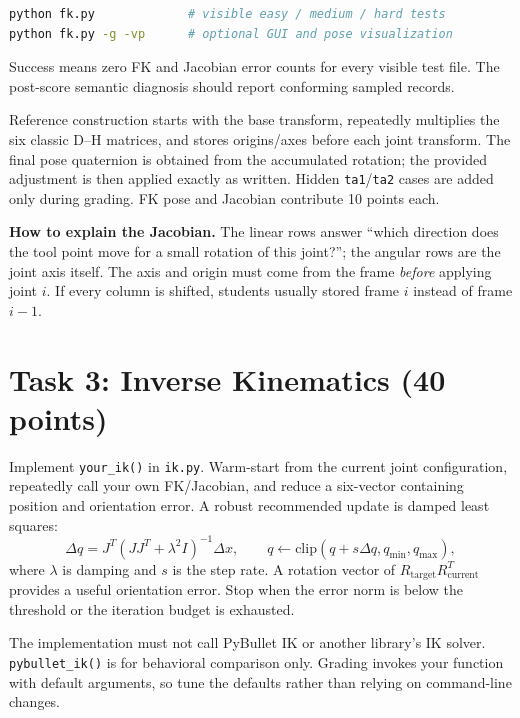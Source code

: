 \documentclass[11pt]{article}
\newcommand{\code}[1]{\nolinkurl{#1}}
\begin{document}
\begin{lstlisting}[language=bash]
python fk.py             # visible easy / medium / hard tests
python fk.py -g -vp      # optional GUI and pose visualization
\end{lstlisting}

Success means zero FK and Jacobian error counts for every visible test file.
The post-score semantic diagnosis should report conforming sampled records.

\begin{tutornote}
Reference construction starts with the base transform, repeatedly multiplies
the six classic D--H matrices, and stores origins/axes before each joint
transform. The final pose quaternion is obtained from the accumulated rotation;
the provided adjustment is then applied exactly as written. Hidden
\code{ta1}/\code{ta2} cases are added only during grading. FK pose and Jacobian
contribute 10 points each.

\textbf{How to explain the Jacobian.} The linear rows answer ``which direction
does the tool point move for a small rotation of this joint?''; the angular
rows are the joint axis itself. The axis and origin must come from the frame
\emph{before} applying joint $i$. If every column is shifted, students usually
stored frame $i$ instead of frame $i-1$.
\end{tutornote}

\section{Task 3: Inverse Kinematics (40 points)}

Implement \code{your_ik()} in \code{ik.py}. Warm-start from the current joint
configuration, repeatedly call your own FK/Jacobian, and reduce a six-vector
containing position and orientation error. A robust recommended update is
damped least squares:
\[
\Delta q=J^T\left(JJ^T+\lambda^2I\right)^{-1}\Delta x,
\qquad q\leftarrow\mathrm{clip}(q+s\Delta q,q_{\min},q_{\max}),
\]
where $\lambda$ is damping and $s$ is the step rate. A rotation vector of
$R_{\mathrm{target}}R_{\mathrm{current}}^T$ provides a useful orientation
error. Stop when the error norm is below the threshold or the iteration budget
is exhausted.

The implementation must not call PyBullet IK or another library's IK solver.
\code{pybullet_ik()} is for behavioral comparison only. Grading invokes your
function with default arguments, so tune the defaults rather than relying on
command-line changes.
\end{document}
